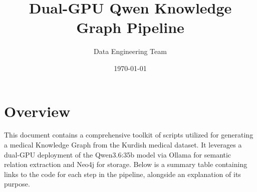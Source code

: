 \documentclass[11pt]{article}
\title{Dual-GPU Qwen Knowledge Graph Pipeline}
\author{Data Engineering Team}
\date{\today}
\begin{document}
\maketitle

\section*{Overview}

This document contains a comprehensive toolkit of scripts utilized for generating a medical Knowledge Graph from the Kurdish medical dataset. It leverages a dual-GPU deployment of the Qwen3.6:35b model via Ollama for semantic relation extraction and Neo4j for storage. Below is a summary table containing links to the code for each step in the pipeline, alongside an explanation of its purpose.
\end{document}
